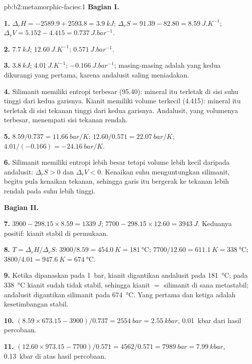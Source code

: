 \begin{solution}{pb:b2:metamorphic-facies:1}
\noindent\textbf{Bagian I.}

\textbf{1.} $\Delta_r H = -2589.9 + 2593.8 = \qty{3.9}{kJ}$; $\Delta_r S = 91.39 - 82.80 =
\qty{8.59}{J.K^{-1}}$; $\Delta_r V = 5.152 - 4.415 = \qty{0.737}{J.bar^{-1}}$.

\textbf{2.} $\qty{7.7}{kJ}$; $\qty{12.60}{J.K^{-1}}$; $\qty{0.571}{J.bar^{-1}}$.

\textbf{3.} $\qty{3.8}{kJ}$; $\qty{4.01}{J.K^{-1}}$; $\qty{-0.166}{J.bar^{-1}}$; masing-masing adalah
yang kedua dikurangi yang pertama, karena andalusit saling meniadakan.

\textbf{4.} Silimanit memiliki entropi terbesar (95.40): mineral itu terletak di sisi suhu tinggi
dari kedua garisnya. Kianit memiliki volume terkecil (4.415): mineral itu terletak di sisi
tekanan tinggi dari kedua garisnya. Andalusit, yang volumenya terbesar, menempati sisi
tekanan rendah.

\textbf{5.} $8.59/0.737 = \qty{11.66}{bar/K}$; $12.60/0.571 = \qty{22.07}{bar/K}$;
$4.01/(-0.166) = \qty{-24.16}{bar/K}$.

\textbf{6.} Silimanit memiliki entropi lebih besar tetapi volume lebih kecil daripada andalusit: $\Delta_r S > 0$
dan $\Delta_r V < 0$. Kenaikan suhu menguntungkan silimanit, begitu pula kenaikan
tekanan, sehingga garis itu bergerak ke tekanan lebih rendah pada suhu lebih tinggi.

\noindent\textbf{Bagian II.}

\textbf{7.} $3900 - 298.15\times8.59 = \qty{+1339}{J}$; $7700 - 298.15\times12.60 =
\qty{+3943}{J}$. Keduanya positif: kianit stabil di permukaan.

\textbf{8.} $T = \Delta_r H/\Delta_r S$: $3900/8.59 = \qty{454.0}{K} = \qty{181}{\celsius}$;
$7700/12.60 = \qty{611.1}{K} = \qty{338}{\celsius}$; $3800/4.01 = \qty{947.6}{K} =
\qty{674}{\celsius}$.

\textbf{9.} Ketika dipanaskan pada \qty{1}{bar}, kianit digantikan andalusit pada
\qty{181}{\celsius}; pada \qty{338}{\celsius} kianit sudah tidak stabil, sehingga kianit $=$
silimanit di sana metastabil; andalusit digantikan silimanit pada
\qty{674}{\celsius}. Yang pertama dan ketiga adalah kesetimbangan stabil.

\textbf{10.} $(8.59\times673.15 - 3900)/0.737 = \qty{2554}{bar} = \qty{2.55}{kbar}$,
\qty{0.01}{kbar} dari hasil percobaan.

\textbf{11.} $(12.60\times973.15 - 7700)/0.571 = 4562/0.571 = \qty{7989}{bar} =
\qty{7.99}{kbar}$, \qty{0.13}{kbar} di atas hasil percobaan.


\end{solution}
